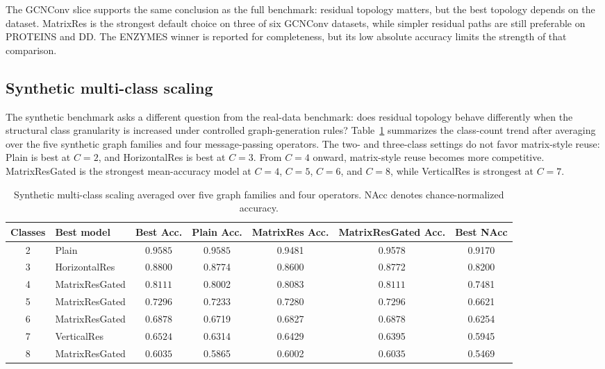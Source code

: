 The GCNConv slice supports the same conclusion as the full benchmark: residual topology matters, but the best topology depends on the dataset. MatrixRes is the strongest default choice on three of six GCNConv datasets, while simpler residual paths are still preferable on PROTEINS and DD. The ENZYMES winner is reported for completeness, but its low absolute accuracy limits the strength of that comparison.

\subsection{Synthetic multi-class scaling}

The synthetic benchmark asks a different question from the real-data benchmark: does residual topology behave differently when the structural class granularity is increased under controlled graph-generation rules? Table~\ref{tab:synthetic_class_scaling} summarizes the class-count trend after averaging over the five synthetic graph families and four message-passing operators. The two- and three-class settings do not favor matrix-style reuse: Plain is best at \(C=2\), and HorizontalRes is best at \(C=3\). From \(C=4\) onward, matrix-style reuse becomes more competitive. MatrixResGated is the strongest mean-accuracy model at \(C=4\), \(C=5\), \(C=6\), and \(C=8\), while VerticalRes is strongest at \(C=7\).

\begin{table}[!htbp]
\centering
\scriptsize
\caption{Synthetic multi-class scaling averaged over five graph families and four operators. NAcc denotes chance-normalized accuracy.}
\label{tab:synthetic_class_scaling}
\begin{tabular}{c l c c c c c}
\toprule
Classes & Best model & Best Acc. & Plain Acc. & MatrixRes Acc. & MatrixResGated Acc. & Best NAcc \\
\midrule
2 & Plain & \(\mathbf{0.9585}\) & \(\mathbf{0.9585}\) & 0.9481 & 0.9578 & 0.9170 \\
3 & HorizontalRes & \(\mathbf{0.8800}\) & 0.8774 & 0.8600 & 0.8772 & 0.8200 \\
4 & MatrixResGated & \(\mathbf{0.8111}\) & 0.8002 & 0.8083 & \(\mathbf{0.8111}\) & 0.7481 \\
5 & MatrixResGated & \(\mathbf{0.7296}\) & 0.7233 & 0.7280 & \(\mathbf{0.7296}\) & 0.6621 \\
6 & MatrixResGated & \(\mathbf{0.6878}\) & 0.6719 & 0.6827 & \(\mathbf{0.6878}\) & 0.6254 \\
7 & VerticalRes & \(\mathbf{0.6524}\) & 0.6314 & 0.6429 & 0.6395 & 0.5945 \\
8 & MatrixResGated & \(\mathbf{0.6035}\) & 0.5865 & 0.6002 & \(\mathbf{0.6035}\) & 0.5469 \\
\bottomrule
\end{tabular}
\end{table}

